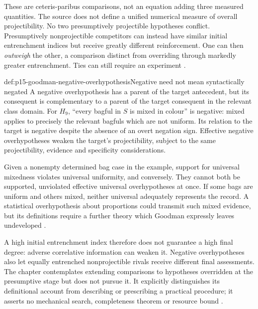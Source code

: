 These are ceteris-paribus comparisons, not an equation adding three
measured quantities. The source does not define a unified numerical
measure of overall projectibility. No two presumptively projectible
hypotheses conflict. Presumptively nonprojectible competitors can instead
have similar initial entrenchment indices but receive greatly different
reinforcement. One can then \emph{outweigh} the other, a comparison distinct
from overriding through markedly greater entrenchment. Ties can still
require an experiment \parencite[pp.~117--118 and n.~22]{Goodman1983FourthProjection}.

\begin{hbdefinition}{def:p15-goodman-negative-overhypothesis}{Negative need not mean syntactically negated}
A negative overhypothesis has a parent of the target antecedent, but its
consequent is complementary to a parent of the target consequent in the
relevant class domain. For $H_9$, ``every bagful in $S$ is mixed in colour''
is negative: mixed applies to precisely the relevant bagfuls which are
not uniform. Its relation to the target is negative despite the absence
of an overt negation sign. Effective negative overhypotheses weaken the
target's projectibility, subject to the same projectibility, evidence
and specificity considerations.
\end{hbdefinition}

Given a nonempty determined bag case in the example, support for universal
mixedness violates universal uniformity, and conversely. They cannot both
be supported, unviolated effective universal overhypotheses at once. If
some bags are uniform and others mixed, neither universal adequately
represents the record. A statistical overhypothesis about proportions
could transmit such mixed evidence, but its definitions require a further
theory which Goodman expressly leaves undeveloped
\parencite[pp.~118--120]{Goodman1983FourthProjection}.

A high initial entrenchment index therefore does not guarantee a high
final degree: adverse correlative information can weaken it. Negative
overhypotheses also let equally entrenched nonprojectible rivals receive
different final assessments. The chapter contemplates extending comparisons
to hypotheses overridden at the presumptive stage but does not pursue it.
It explicitly distinguishes its definitional account from describing or
prescribing a practical procedure; it asserts no mechanical search,
completeness theorem or resource bound \parencite[p.~120]{Goodman1983FourthProjection}.

